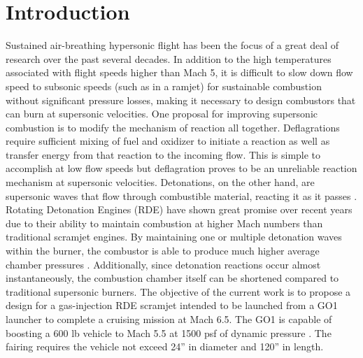 \section{Introduction}
Sustained air-breathing hypersonic flight has been the focus of a great deal of research over the past several decades. In addition to the high temperatures associated with flight speeds higher than Mach 5, it is difficult to slow down flow speed to subsonic speeds (such as in a ramjet) for sustainable combustion without significant pressure losses, making it necessary to design combustors that can burn at supersonic velocities. One proposal for improving supersonic combustion is to modify the mechanism of reaction all together. Deflagrations require sufficient mixing of fuel and oxidizer to initiate a reaction as well as transfer energy from that reaction to the incoming flow. This is simple to accomplish at low flow speeds but deflagration proves to be an unreliable reaction mechanism at supersonic velocities. Detonations, on the other hand, are supersonic waves that flow through combustible material, reacting it as it passes \cite{wang}. Rotating Detonation Engines (RDE) have shown great promise over recent years due to their ability to maintain combustion at higher Mach numbers than traditional scramjet engines. By maintaining one or multiple detonation waves within the burner, the combustor is able to produce much higher average chamber pressures \cite{bykovskii}.  Additionally, since detonation reactions occur almost instantaneously, the combustion chamber itself can be shortened compared to traditional supersonic burners. The objective of the current work is to propose a design for a gas-injection RDE scramjet intended to be launched from a GO1 launcher to complete a cruising mission at Mach 6.5. The GO1 is capable of boosting a 600 lb vehicle to Mach 5.5 at 1500 psf of dynamic pressure \cite{go1}. The fairing requires the vehicle not exceed 24” in diameter and 120” in length. 